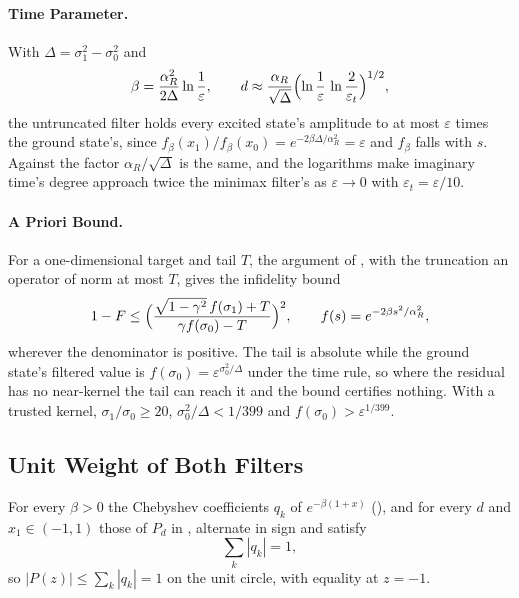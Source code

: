 \paragraph{Time Parameter.} With $\Delta=\sigma_1^2-\sigma_0^2$ and
\begin{equation}
    \beta=\frac{\alpha_R^2}{2\Delta}\ln\frac1\varepsilon,
    \qquad
    d\approx\frac{\alpha_R}{\sqrt\Delta}\Bigl(\ln\frac1\varepsilon\,\ln\frac2{\varepsilon_t}\Bigr)^{1/2},
    \label{eq:qite-parameters}
\end{equation}
the untruncated filter holds every excited state's amplitude to at most $\varepsilon$ times the ground state's, since $f_\beta(x_1)/f_\beta(x_0)=e^{-2\beta\Delta/\alpha_R^2}=\varepsilon$ and $f_\beta$ falls with $s$. Against  the factor $\alpha_R/\sqrt\Delta$ is the same, and the logarithms make imaginary time's degree approach twice the minimax filter's as $\varepsilon\to0$ with $\varepsilon_t=\varepsilon/10$.

\paragraph{A Priori Bound.} For a one-dimensional target and tail $T$, the argument of , with the truncation an operator of norm at most $T$, gives the infidelity bound
\begin{equation*}
    1-F\le\Bigl(\frac{\sqrt{1-\gamma^2}\,f(\sigma_1)+T}{\gamma f(\sigma_0)-T}\Bigr)^2,
    \qquad f(s)=e^{-2\beta s^2/\alpha_R^2},
\end{equation*}
wherever the denominator is positive. The tail is absolute while the ground state's filtered value is $f(\sigma_0)=\varepsilon^{\sigma_0^2/\Delta}$ under the time rule, so where the residual has no near-kernel the tail can reach it and the bound certifies nothing. With a trusted kernel, $\sigma_1/\sigma_0\ge20$, $\sigma_0^2/\Delta<1/399$ and $f(\sigma_0)>\varepsilon^{1/399}$.

\subsection{Unit Weight of Both Filters}
\label{app:proof-filter-normalisation}

\begin{proposition}
\label{prop:filter-normalisation}
For every $\beta>0$ the Chebyshev coefficients $q_k$ of $e^{-\beta(1+x)}$ (), and for every $d$ and $x_1\in(-1,1)$ those of $P_d$ in , alternate in sign and satisfy
\begin{equation}
    \sum_{k}|q_k|=1 ,
    \label{eq:filter-normalisation}
\end{equation}
so $|P(z)|\le\sum_k|q_k|=1$ on the unit circle, with equality at $z=-1$.
\end{proposition}

